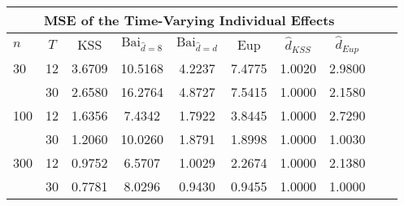 \begin{tabular}{lccccccccc} 
\hline \multicolumn{8}{c}{MSE of the Time-Varying Individual Effects} \\ \hline 
$n$ & $T$ & KSS & $ \text{Bai}_{\hat{d} = 8}$ & $\text{Bai}_{\hat{d} = d}$ & Eup & $\hat{d}_{KSS}$ & $\hat{d}_{Eup}$ \\
\hline
30 & 12 &  3.6709  &  10.5168  &  4.2237  &  7.4775  &  1.0020  &  2.9800  \\
& 30 &  2.6580  &  16.2764  &  4.8727  &  7.5415  &  1.0000  &  2.1580  \\
100 & 12 &  1.6356  &  7.4342  &  1.7922  &  3.8445  &  1.0000  &  2.7290  \\
& 30 &  1.2060  &  10.0260  &  1.8791  &  1.8998  &  1.0000  &  1.0030  \\
300 & 12 &  0.9752  &  6.5707  &  1.0029  &  2.2674  &  1.0000  &  2.1380  \\
& 30 &  0.7781  &  8.0296  &  0.9430  &  0.9455  &  1.0000  &  1.0000  \\
\end{tabular} 
